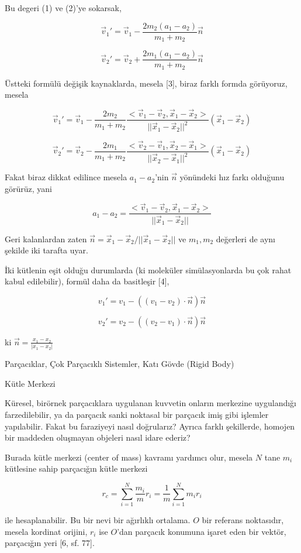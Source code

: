 \documentclass[12pt,fleqn]{article}\usepackage{../../common}
\begin{document}
Bu degeri (1) ve (2)'ye sokarsak,


$$
\vec{v}_1' = \vec{v}_1 - \frac{2 m_2 (a_1-a_2)}{m_1+m_2} \vec{n}
$$

$$
\vec{v}_2' = \vec{v}_2 + \frac{2 m_1 (a_1-a_2)}{m_1+m_2} \vec{n}
$$

Üstteki formülü değişik kaynaklarda, mesela [3], biraz farklı formda görüyoruz,
mesela

$$
\vec{v}_1' =
\vec{v}_1 - \frac{2m_2}{m_1+m_2}
\frac{< \vec{v}_1-\vec{v}_2, \vec{x}_1-\vec{x}_2 >}{||\vec{x}_1-\vec{x}_2||^2}
(\vec{x}_1-\vec{x}_2)
$$

$$
\vec{v}_2' =
\vec{v}_2 - \frac{2m_1}{m_1+m_2}
\frac{< \vec{v}_2-\vec{v}_1, \vec{x}_2-\vec{x}_1 >}{||\vec{x}_2-\vec{x}_1||^2}
(\vec{x}_1-\vec{x}_2)
$$

Fakat biraz dikkat edilince mesela $a_1-a_2$'nin $\vec{n}$ yönündeki hız farkı
olduğunu görürüz, yani

$$
a_1-a_2=\frac{< \vec{v}_1-\vec{v}_2,\vec{x}_1-\vec{x}_2 >}{||\vec{x}_1-\vec{x}_2||}
$$

Geri kalanlardan zaten $\vec{n} = \vec{x}_1-\vec{x}_2/||\vec{x}_1-\vec{x}_2||$
ve $m_1,m_2$ değerleri de aynı şekilde iki tarafta uyar.

İki kütlenin eşit olduğu durumlarda (ki moleküler simülasyonlarda bu çok rahat
kabul edilebilir), formül daha da basitleşir [4],

$$
v_1' = v_1 - \left( (v_1-v_2)  \cdot \vec{n} \right) \vec{n}
$$

$$
v_2' = v_2 - \left( (v_2-v_1)  \cdot \vec{n} \right) \vec{n}
$$

ki $\vec{n} = \frac{x_1-x_2}{|x_1-x_2|}$

Parçacıklar, Çok Parçacıklı Sistemler, Katı Gövde (Rigid Body)

Kütle Merkezi

Küresel, birörnek parçacıklara uygulanan kuvvetin onların merkezine uygulandığı
farzedilebilir, ya da parçacık sanki noktasal bir parçacık imiş gibi işlemler
yapılabilir. Fakat bu faraziyeyi nasıl doğrularız? Ayrıca farklı şekillerde,
homojen bir maddeden oluşmayan objeleri nasıl idare ederiz?

Burada kütle merkezi (center of mass) kavramı yardımcı olur, mesela $N$ tane
$m_i$ kütlesine sahip parçacığın kütle merkezi

$$
r_c =
\sum _{i=1}^{N} \frac{m_i}{m} r_i =
\frac{1}{m} \sum _{i=1}^{N} m_i r_i
$$

ile hesaplanabilir. Bu bir nevi bir ağırlıklı ortalama. $O$ bir referans
noktasıdır, mesela kordinat orijini, $r_i$ ise $O$'dan parçacık konumuna işaret
eden bir vektör, parçacığın yeri [6, sf. 77].
\end{document}
